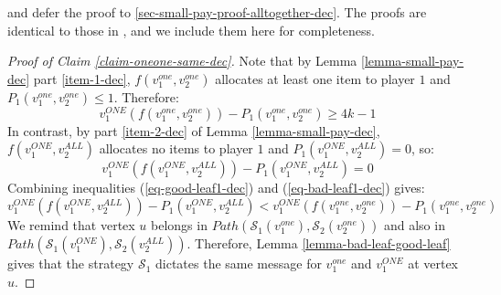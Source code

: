 and defer the proof to  \cref{sec-small-pay-proof-alltogether-dec}.  The proofs are identical to those in \cite{Ron24}, and we include them here for completeness.
\begin{proof}[Proof of Claim \ref{claim-oneone-same-dec}]
    Note that by Lemma \ref{lemma-small-pay-dec} part \ref{item-1-dec}, $f(v_1^{one},v_2^{one})$ allocates at least one item to player $1$ and $P_1(v_1^{one},v_2^{one})\le 1$. Therefore:
\begin{equation}\label{eq-good-leaf1-dec}
 v_1^{ONE}(f(v_1^{one},v_2^{one}))-P_1(v_1^{one},v_2^{one})\ge 4k-1 
\end{equation}
 In contrast, by part \ref{item-2-dec} of Lemma \ref{lemma-small-pay-dec},   $f(v_1^{ONE},v_2^{ALL})$ allocates no items to player $1$ and $P_1(v_1^{ONE},v_2^{ALL})=0$, so:
 \begin{equation}\label{eq-bad-leaf1-dec}
 v_1^{ONE}(f(v_1^{ONE},v_2^{ALL}))-P_1(v_1^{ONE},v_2^{ALL})= 0   
\end{equation}
Combining inequalities (\ref{eq-good-leaf1-dec}) and (\ref{eq-bad-leaf1-dec}) gives:
\begin{equation*}
  v_1^{ONE}(f(v_1^{ONE},v_2^{ALL}))-P_1(v_1^{ONE},v_2^{ALL})< 
  v_1^{ONE}(f(v_1^{one},v_2^{one}))-P_1(v_1^{one},v_2^{one})  
\end{equation*}
We remind that vertex $u$ belongs in $Path(\mathcal S_1(v_1^{one}),\mathcal S_2(v_2^{one}))$ and also in
$Path(\mathcal{S}_1(v_1^{ONE}),\allowbreak\mathcal{S}_2(v_2^{ALL}))$. Therefore, Lemma \ref{lemma-bad-leaf-good-leaf} gives that the strategy $\mathcal S_1$ dictates the same message for  $v_1^{one}$ and $v_1^{ONE}$ at vertex $u$.
\end{proof}

